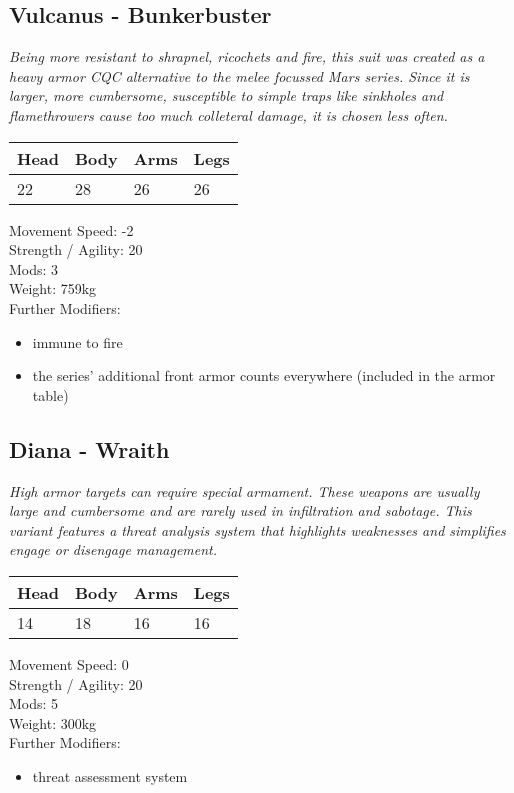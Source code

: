 \documentclass[12pt,a4paper,openany]{book}
\begin{document}
	\subsection{Vulcanus - Bunkerbuster}
	\textit{Being more resistant to shrapnel, ricochets and fire, this suit was created as a heavy armor CQC alternative to the melee focussed Mars series. Since it is larger, more cumbersome, susceptible to simple traps like sinkholes and flamethrowers cause too much colleteral damage, it is chosen less often.}\par
	\begin{tabular}{|l|l|l|l|}
		\hline
		Head & Body & Arms & Legs\\
		\hline
		22 & 28 & 26 & 26\\
		\hline
	\end{tabular}
	\par
	Movement Speed: -2\\
	Strength / Agility: 20\\
	Mods: 3\\
	Weight: 759kg\\
	Further Modifiers:
	\vspace{-8mm}
	\begin{itemize}
		\setlength\itemsep{-8mm}
		\item immune to fire
		\item the series' additional front armor counts everywhere (included in the armor table)
	\end{itemize}
	\par
	\subsection{Diana - Wraith}
	\textit{High armor targets can require special armament. These weapons are usually large and cumbersome and are rarely used in infiltration and sabotage. This variant features a threat analysis system that highlights weaknesses and simplifies engage or disengage management.}\par
	\begin{tabular}{|l|l|l|l|}
		\hline
		Head & Body & Arms & Legs\\
		\hline
		14 & 18 & 16 & 16\\
		\hline
	\end{tabular}
	\par
	Movement Speed: 0\\
	Strength / Agility: 20\\
	Mods: 5\\
	Weight: 300kg\\
	Further Modifiers:
	\vspace{-8mm}
	\begin{itemize}
		\setlength\itemsep{-8mm}
		\item threat assessment system
	\end{itemize}
	\par
\end{document}

